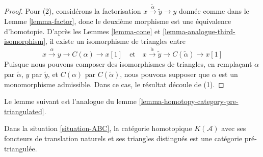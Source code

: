 \begin{proof}
\medskip\noindent
Pour (2), considérons la factorisation $x\xrightarrow{\tilde{\alpha}}\tilde{y}\to
y$ donnée comme dans le Lemme \ref{lemma-factor}, donc le deuxième morphisme est
une équivalence d'homotopie. D'après les Lemmes \ref{lemma-cone} et
\ref{lemma-analogue-third-isomorphism}, il existe un isomorphisme de triangles
entre
$$
x \xrightarrow{\alpha} y \to C(\alpha) \to x[1]
\quad\text{et}\quad
x \xrightarrow{\tilde{\alpha}} \tilde{y} \to C(\tilde{\alpha}) \to x[1]
$$
Puisque nous pouvons composer des isomorphismes de triangles, en remplaçant
$\alpha$ par $\tilde{\alpha}$, $y$ par $\tilde{y}$, et $C(\alpha)$ par
$C(\tilde{\alpha})$, nous pouvons supposer que $\alpha$ est un monomorphisme
admissible. Dans ce cas, le résultat découle de (1).
\end{proof}

\noindent
Le lemme suivant est l'analogue du lemme
\ref{lemma-homotopy-category-pre-triangulated}.

\begin{lemma}
\label{lemma-analogue-homotopy-category-pre-triangulated}
Dans la situation \ref{situation-ABC}, la catégorie homotopique $K(\mathcal{A})$
avec ses foncteurs de translation naturels et ses triangles distingués est une
catégorie pré-triangulée.
\end{lemma}

